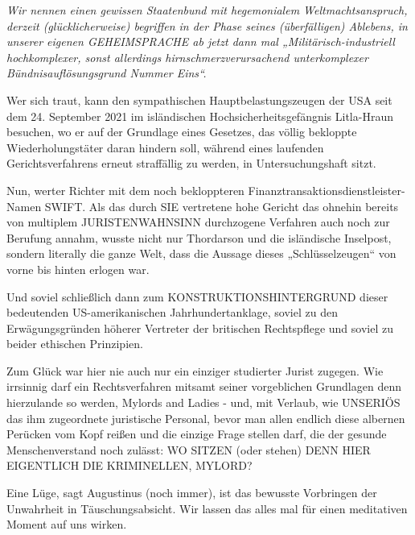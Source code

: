 \begin{multicols}{2}
\textit{
Wir nennen einen gewissen Staatenbund mit hegemonialem Weltmachtsanspruch, derzeit (glücklicherweise)
begriffen in der Phase seines (überfälligen) Ablebens, in
unserer eigenen GEHEIMSPRACHE ab jetzt dann mal
„Militärisch-industriell hochkomplexer, sonst allerdings
hirnschmerzverursachend unterkomplexer Bündnisauflösungsgrund Nummer Eins“.
}

Wer sich traut, kann den sympathischen Hauptbelastungszeugen der USA seit dem 24. September 2021 im
isländischen Hochsicherheitsgefängnis Litla-Hraun besuchen, wo er auf der Grundlage eines Gesetzes, das
völlig bekloppte Wiederholungstäter daran hindern soll,
während eines laufenden Gerichtsverfahrens erneut
straffällig zu werden, in Untersuchungshaft sitzt.

Nun, werter Richter mit dem noch bekloppteren Finanztransaktionsdienstleister-Namen SWIFT. Als das durch
SIE vertretene hohe Gericht das ohnehin bereits von
multiplem JURISTENWAHNSINN durchzogene Verfahren auch noch zur Berufung annahm, wusste nicht nur
Thordarson und die isländische Inselpost, sondern literally die ganze Welt, dass die Aussage dieses „Schlüsselzeugen“ von vorne bis hinten erlogen war.

Und soviel schließlich dann zum KONSTRUKTIONSHINTERGRUND dieser bedeutenden US-amerikanischen Jahrhundertanklage, soviel zu den Erwägungsgründen höherer Vertreter der britischen Rechtspflege
und soviel zu beider ethischen Prinzipien.

Zum Glück war hier nie auch nur ein einziger studierter Jurist zugegen. Wie irrsinnig darf ein Rechtsverfahren
mitsamt seiner vorgeblichen Grundlagen denn hierzulande so werden, Mylords and Ladies - und, mit Verlaub,
wie UNSERIÖS das ihm zugeordnete juristische Personal, bevor man allen endlich diese albernen Perücken
vom Kopf reißen und die einzige Frage stellen darf, die
der gesunde Menschenverstand noch zulässt: WO SITZEN (oder stehen) DENN HIER EIGENTLICH DIE KRIMINELLEN, MYLORD?

Eine Lüge, sagt Augustinus (noch immer), ist das bewusste Vorbringen der Unwahrheit in Täuschungsabsicht. Wir lassen das alles mal für einen meditativen Moment auf uns wirken.



\end{multicols}
